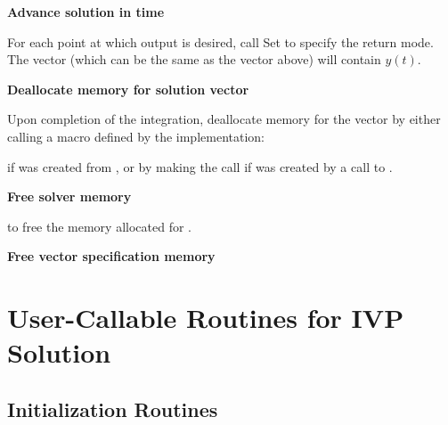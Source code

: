 \begin{Steps}
\item
  {\bf Advance solution in time}

  For each point at which output is desired, call
  Set  to specify the return mode.
  The vector  (which can be the same as
  the vector  above) will contain $y(t)$.
  
\item
  {\bf Deallocate memory for solution vector}

  Upon completion of the integration, deallocate memory for the vector 
  by either calling a macro defined by the {\nvector} implementation:

  {\s} 

  {\p} 

  if  was created from , or by making the call 
   if  was created by a call to .
  
\item
  {\bf Free solver memory}

   to free the memory allocated for {\cvodes}.
  
\item
  {\bf Free vector specification memory}

  {\s} 

  {\p} 
  
\end{Steps}

\section{User-Callable Routines for IVP Solution}
\label{ss:cvodes_fct_sim}

\subsection{{\cvodes} Initialization Routines}\label{sss:cvodemalloc}



